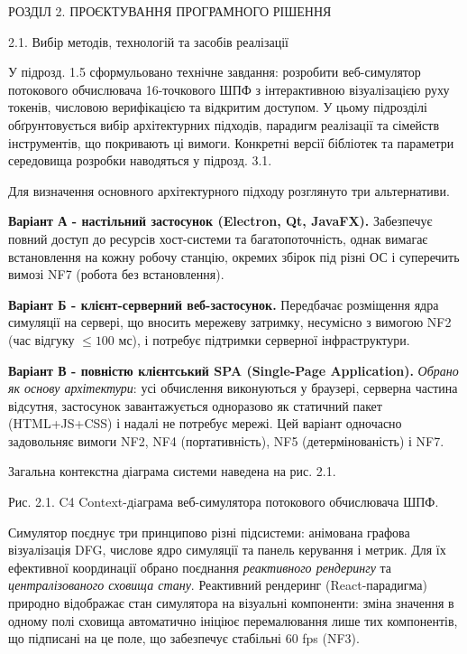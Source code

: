 \documentclass[
]{article}
\begin{document}
\protect{}\label{_Toc230737385}{}РОЗДІЛ 2. ПРОЄКТУВАННЯ
ПРОГРАМНОГО РІШЕННЯ

\protect{}\label{X1a4d34ad0a12769944c99849904512a7f903224}{}2.1.
Вибір методів, технологій та засобів реалізації

У підрозд. 1.5 сформульовано технічне завдання: розробити веб-симулятор
потокового обчислювача 16-точкового ШПФ з інтерактивною візуалізацією
руху токенів, числовою верифікацією та відкритим доступом. У цьому
підрозділі обґрунтовується вибір архітектурних підходів, парадигм
реалізації та сімейств інструментів, що покривають ці вимоги. Конкретні
версії бібліотек та параметри середовища розробки наводяться у підрозд.
3.1.

Для визначення основного архітектурного підходу розглянуто три
альтернативи.

\textbf{Варіант А - настільний застосунок (Electron, Qt, JavaFX).}
Забезпечує повний доступ до ресурсів хост-системи та багатопоточність,
однак вимагає встановлення на кожну робочу станцію, окремих збірок під
різні ОС і суперечить вимозі NF7 (робота без встановлення).

\textbf{Варіант Б - клієнт-серверний веб-застосунок.} Передбачає
розміщення ядра симуляції на сервері, що вносить мережеву затримку,
несумісно з вимогою NF2 (час відгуку \(\leq 100\) мс), і потребує
підтримки серверної інфраструктури.

\textbf{Варіант В - повністю клієнтський SPA (Single-Page Application).}
\emph{Обрано як основу архітектури}: усі обчислення виконуються у
браузері, серверна частина відсутня, застосунок завантажується
одноразово як статичний пакет (HTML+JS+CSS) і надалі не потребує мережі.
Цей варіант одночасно задовольняє вимоги NF2, NF4 (портативність), NF5
(детермінованість) і NF7.

Загальна контекстна діаграма системи наведена на рис. 2.1.



Рис. 2.1. C4 Context-дiаграма веб-симулятора потокового обчислювача ШПФ.

Симулятор поєднує три принципово різні підсистеми: анімована графова
візуалізація DFG, числове ядро симуляції та панель керування і метрик.
Для їх ефективної координації обрано поєднання \emph{реактивного
рендерингу} та \emph{централізованого сховища стану}. Реактивний
рендеринг (React-парадигма) природно відображає стан симулятора на
візуальні компоненти: зміна значення в одному полі сховища автоматично
ініціює перемалювання лише тих компонентів, що підписані на це поле, що
забезпечує стабільні 60 fps (NF3).
\end{document}
